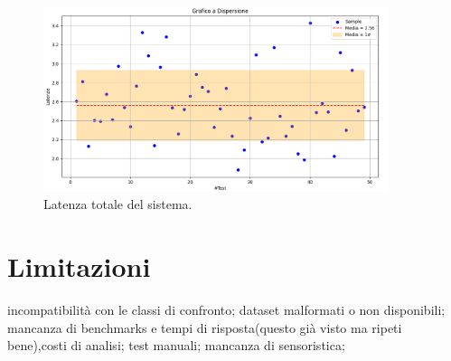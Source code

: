 \begin{figure}[htbp]
    \centering
    \includegraphics[width=0.9\textwidth]{figures/system-latency.png}
    \caption{Latenza totale del sistema.} 
    \label{fig:system-latency}
\end{figure}

\section{Limitazioni}

incompatibilità con le classi di confronto; dataset malformati o non disponibili;
mancanza di benchmarks e tempi di risposta(questo già visto ma ripeti bene),costi di analisi;
test manuali;
mancanza di sensoristica;